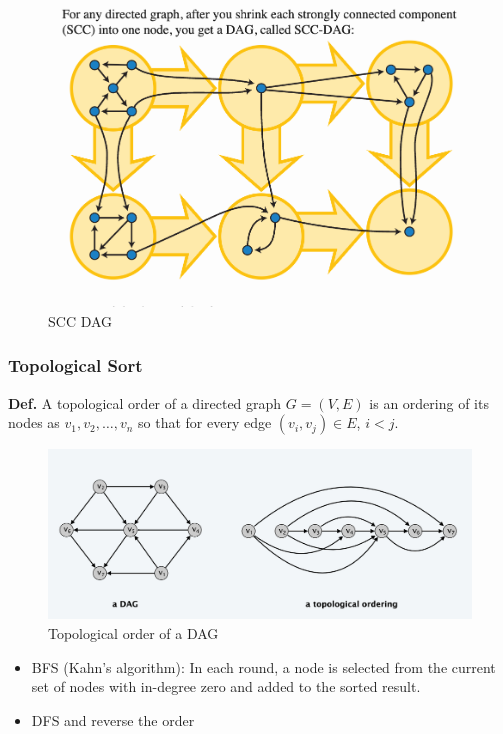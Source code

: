 \documentclass[12pt,a4paper]{article}
\begin{document}
\begin{figure}[H]
    \centering
    \includegraphics[width=\textwidth]{./images/scc_dag.png}
    \caption{SCC DAG}
    \label{fig:scc_dag}
\end{figure}

\subsubsection*{Topological Sort}

\textbf{Def.} A topological order  of a directed graph $G = (V, E)$ is an ordering of its nodes
as $v_1, v_2, \dots, v_n$ so that for every edge $(v_i, v_j) \in E$, $i < j$.

\begin{figure}[H]
    \centering
    \includegraphics[width=\textwidth]{./images/topological_order.png}
    \caption{Topological order of a DAG}
    \label{fig:topological_order}
\end{figure}

\begin{itemize}
    \item BFS (Kahn's algorithm): In each round, a node is selected from the current set of nodes with in-degree zero and added to the sorted result.
    \item DFS and reverse the order
\end{itemize}
\end{document}
